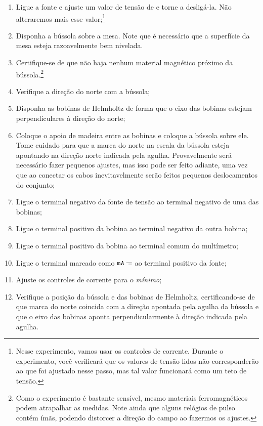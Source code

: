 \begin{enumerate}
	\item Ligue a fonte e ajuste um valor de tensão de  e torne a desligá-la. Não alteraremos mais esse valor;\footnote{Nesse experimento, vamos usar os controles de corrente. Durante o experimento, você verificará que os valores de tensão lidos não corresponderão ao que foi ajustado nesse passo, mas tal valor funcionará como um teto de tensão.}
	\item Disponha a bússola sobre a mesa. Note que é necessário que a superfície da mesa esteja razoavelmente bem nivelada.
	\item Certifique-se de que não haja nenhum material magnético próximo da bússola.\footnote{Como o experimento é bastante sensível, mesmo materiais ferromagnéticos podem atrapalhar as medidas. Note ainda que alguns relógios de pulso contém ímãs, podendo distorcer a direção do campo ao fazermos os ajustes.}
	\item Verifique a direção do norte com a bússola;
	\item Disponha as bobinas de Helmholtz de forma que o eixo das bobinas estejam perpendiculares à direção do norte;
	\item Coloque o apoio de madeira entre as bobinas e coloque a bússola sobre ele. Tome cuidado para que a marca do norte na escala da bússola esteja apontando na direção norte indicada pela agulha. Provavelmente será necessário fazer pequenos ajustes, mas isso pode ser feito adiante, uma vez que ao conectar os cabos inevitavelmente serão feitos pequenos deslocamentos do conjunto;
	\item Ligue o terminal negativo da fonte de tensão ao terminal negativo de uma das bobinas;
	\item Ligue o terminal positivo da bobina ao terminal negativo da outra bobina;
	\item Ligue o terminal positivo da bobina ao terminal comum do multímetro;
	\item Ligue o terminal marcado como $\texttt{mA}\mathdirectcurrent$ ao terminal positivo da fonte;
	\item Ajuste os controles de corrente para o \emph{mínimo};
	\item Verifique a posição da bússola e das bobinas de Helmholtz, certificando-se de que marca do norte coincida com a direção apontada pela agulha da bússola e que o eixo das bobinas aponta perpendicularmente à direção indicada pela agulha.

\end{enumerate}
